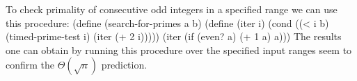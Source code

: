 To check primality of consecutive odd integers in a specified range we can use this procedure:
\begtt\scm
(define (search-for-primes a b)
  (define (iter i)
    (cond ((< i b) (timed-prime-test i) (iter (+ 2 i)))))
  (iter (if (even? a) (+ 1 a) a)))
\endtt
The results one can obtain by running this procedure over the specified input ranges seem to confirm the $\Theta(\sqrt n)$ prediction.
